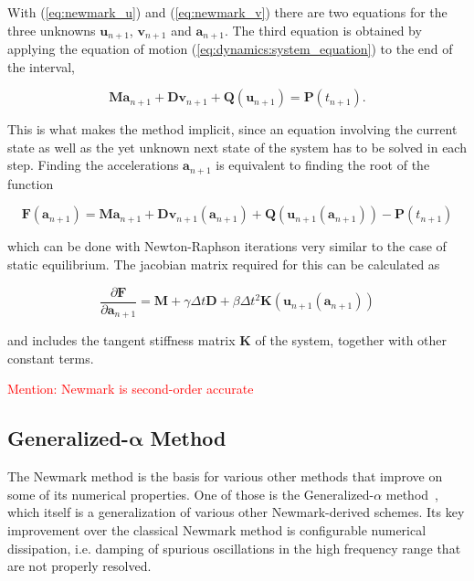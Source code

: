 With (\ref{eq:newmark_u}) and (\ref{eq:newmark_v}) there are two equations for the three unknowns $\boldsymbol{u}_{n+1}$, $\mathbf{v}_{n+1}$ and $\boldsymbol{a}_{n+1}$.
The third equation is obtained by applying the equation of motion (\ref{eq:dynamics:system_equation}) to the end of the interval,

\begin{equation}
\boldsymbol{M}\boldsymbol{a}_{n+1} + \boldsymbol{D}\mathbf{v}_{n+1} + \boldsymbol{Q}(\boldsymbol{u}_{n+1}) = \boldsymbol{P}(t_{n+1}). \label{eq:newmark_balance}
\end{equation}

This is what makes the method implicit, since an equation involving the current state as well as the yet unknown next state of the system has to be solved in each step.
Finding the accelerations $\boldsymbol{a}_{n+1}$ is equivalent to finding the root of the function

$$
\boldsymbol{F}(\boldsymbol{a}_{n+1}) = \boldsymbol{M}\boldsymbol{a}_{n+1} + \boldsymbol{D}\mathbf{v}_{n+1}(\boldsymbol{a}_{n+1}) + \boldsymbol{Q}(\boldsymbol{u}_{n+1}(\boldsymbol{a}_{n+1})) - \boldsymbol{P}(t_{n+1})
$$

which can be done with Newton-Raphson iterations very similar to the case of static equilibrium.
The jacobian matrix required for this can be calculated as

$$
\frac{\partial \boldsymbol{F}}{\partial \boldsymbol{a}_{n+1}} = \boldsymbol{M} + \gamma \Delta t \boldsymbol{D} + \beta \Delta t^2 \boldsymbol{K}(\boldsymbol{u}_{n+1}(\boldsymbol{a}_{n+1}))
$$

and includes the tangent stiffness matrix $\boldsymbol{K}$ of the system, together with other constant terms.

\textcolor{red}{Mention: Newmark is second-order accurate}

\subsection{Generalized-$\boldsymbol{\alpha}$ Method}

The Newmark method is the basis for various other methods that improve on some of its numerical properties.
One of those is the Generalized-$\alpha$ method~\cite{bib:chung1993}, which itself is a generalization of various other Newmark-derived schemes.
Its key improvement over the classical Newmark method is configurable numerical dissipation, i.e. damping of spurious oscillations in the high frequency range that are not properly resolved.


